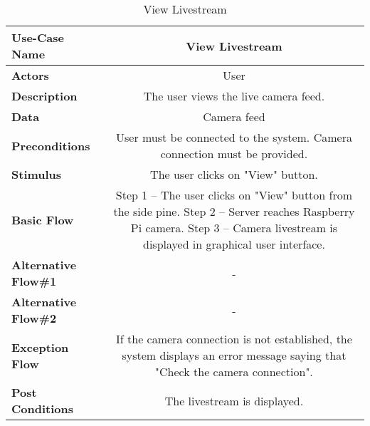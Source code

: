 \begin{table}[H]
     \centering
     \begin{tabular}{|l|C|}
         \hline
          \textbf{Use-Case Name} & View Livestream \\
         \hline
          \textbf{Actors} & User \\ 
         \hline
          \textbf{Description} & The user views the live camera feed. \\ 
         \hline
          \textbf{Data} & Camera feed\\ 
         \hline
          \textbf{Preconditions} & 
          User must be connected to the system. \newline
          Camera connection must be provided. \\
         \hline
          \textbf{Stimulus} & The user clicks on "View" button. \\ 
         \hline
          \textbf{Basic Flow} & 
          Step 1 -- The user clicks on "View" button from the side pine. \newline
		  Step 2 -- Server reaches Raspberry Pi camera. \newline
		  Step 3 -- Camera livestream is displayed in graphical user interface. \\
         \hline
          \textbf{Alternative Flow\#1} & - \\
         \hline
          \textbf{Alternative Flow\#2} & - \\
         \hline
          \textbf{Exception Flow} & If the camera connection is not established, the system displays an error message saying that "Check the camera connection".\\
         \hline
          \textbf{Post Conditions} & The livestream is displayed. \\ 
         \hline
     \end{tabular}
     \caption{View Livestream}
     \label{tab:view_livestream}
 \end{table}